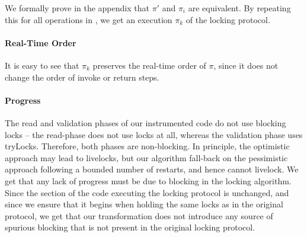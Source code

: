 We formally prove in the appendix that $\pi'$ and $\pi_i$ are equivalent. 
By repeating this for all operations in \op, we get an execution $\pi_k$ of the locking protocol.

\paragraph{Real-Time Order}
It is easy to see that $\pi_k$ preserves the real-time order of $\pi$, since it does not change the order of invoke or return steps. 

\paragraph{Progress}
The read and validation phases of our instrumented code do not use blocking locks -- the read-phase does not use locks at all, whereas the 
validation phase uses tryLocks. Therefore, both phases are non-blocking. In principle, the optimistic approach may lead to livelocks, but 
our algorithm fall-back on the pessimistic approach following a bounded number of restarts, and hence cannot livelock. We get that any lack
of progress must be due to blocking in the locking algorithm. Since the section of the code executing the locking protocol is unchanged, and
since we ensure that it begins when holding the same locks as in the original protocol, we get that our transformation does not introduce any
source of spurious blocking that is not present in the original locking protocol. 



